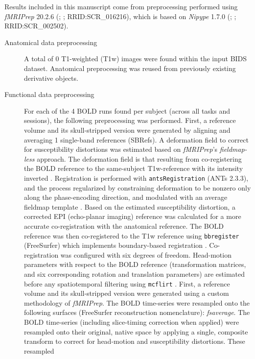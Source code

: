 \documentclass[]{article}
\date{}
\begin{document}
Results included in this manuscript come from preprocessing performed
using \emph{fMRIPrep} 20.2.6 (\citet{fmriprep1}; \citet{fmriprep2};
RRID:SCR\_016216), which is based on \emph{Nipype} 1.7.0
(\citet{nipype1}; \citet{nipype2}; RRID:SCR\_002502).

\begin{description}
\item[Anatomical data preprocessing]
A total of 0 T1-weighted (T1w) images were found within the input BIDS
dataset. Anatomical preprocessing was reused from previously existing
derivative objects.
\item[Functional data preprocessing]
For each of the 4 BOLD runs found per subject (across all tasks and
sessions), the following preprocessing was performed. First, a reference
volume and its skull-stripped version were generated by aligning and
averaging 1 single-band references (SBRefs). A deformation field to
correct for susceptibility distortions was estimated based on
\emph{fMRIPrep}'s \emph{fieldmap-less} approach. The deformation field
is that resulting from co-registering the BOLD reference to the
same-subject T1w-reference with its intensity inverted
\citep{fieldmapless1, fieldmapless2}. Registration is performed with
\texttt{antsRegistration} (ANTs 2.3.3), and the process regularized by
constraining deformation to be nonzero only along the phase-encoding
direction, and modulated with an average fieldmap template
\citep{fieldmapless3}. Based on the estimated susceptibility distortion,
a corrected EPI (echo-planar imaging) reference was calculated for a
more accurate co-registration with the anatomical reference. The BOLD
reference was then co-registered to the T1w reference using
\texttt{bbregister} (FreeSurfer) which implements boundary-based
registration \citep{bbr}. Co-registration was configured with six
degrees of freedom. Head-motion parameters with respect to the BOLD
reference (transformation matrices, and six corresponding rotation and
translation parameters) are estimated before any spatiotemporal
filtering using \texttt{mcflirt} \citep[FSL 5.0.9,][]{mcflirt}. First, a
reference volume and its skull-stripped version were generated using a
custom methodology of \emph{fMRIPrep}. The BOLD time-series were
resampled onto the following surfaces (FreeSurfer reconstruction
nomenclature): \emph{fsaverage}. The BOLD time-series (including
slice-timing correction when applied) were resampled onto their
original, native space by applying a single, composite transform to
correct for head-motion and susceptibility distortions. These resampled

\end{description}
\end{document}
